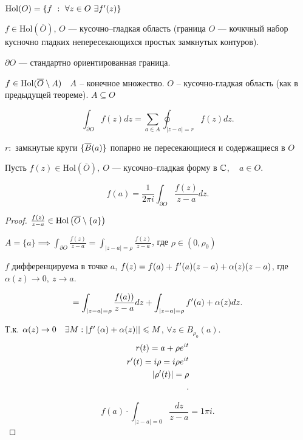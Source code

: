 $\mathrm{Hol} (O) = \{ f ~:~ \forall z \in O ~\exists f^{\prime} (z) \}$

\begin{theorem}[Коши]
    $f \in \mathrm{Hol} (\overline{O})$, $O$ --- кусочно--гладкая область (граница $O$  --- кочкчный набор кусночно  гладких непересекающихся простых замкнутых контуров).

    $\partial O$ --- стандартно ориентированная граница.
\end{theorem}

\begin{theorem}

    $f\in \mathrm{Hol}(\overline{O} \setminus A)\quad A$ -- конечное множество. $O$ -- кусочно-гладкая область (как в предыдущей теореме). $A \subseteq O$

    \[
    \int_{\partial O} f(z) dz = \sum_{a\in A} \oint_{|z-a| = r} f(z)dz
    .\]

    $r:$ замкнутые круги $\{\overline{B}(a)\}$ попарно не пересекающиеся и содержащиеся в $O$
\end{theorem}


\begin{statement}    
Пусть $f (z) \in \mathrm{Hol} (\overline{O}),~ O$ --- кусочно--гладкая форму в $\mathbb{C}$, ~ $a \in O$.

\[
f(a) = \frac{1}{2\pi i} \int_{\partial O} \frac{f(z)}{z-a}dz
.\]
\end{statement}
\begin{proof}
    $\frac{f(z)}{z-a}\in \mathrm{Hol}\left( \overline{O} \setminus \{a\} \right) $

    $A = \{a\} \implies \int_{\partial O} \frac{f(z)}{z-a} = \int_{|z-a| = \rho} \frac{f(z)}{z-a}$, где $\rho\in \left( 0, \rho_0 \right) $

    $f$  дифференцируема в точке $a$, $f(z) = f (a) + f^{\prime}(a) (z - a) + \alpha (z) (z - a)$, где $\alpha (z) \to 0, ~ z \to a$.

    \[ = \int_{|z - a | = \rho } \dfrac{f(a))}{z - a} dz + \int_{|z - a | = \rho} f^{\prime} (a) + \alpha (z) dz. \] %

    Т.к. $\alpha(z) \to 0\quad \exists M : \left| f^{\prime}\left( \alpha\right) + \alpha (z)|  \right| \leqslant M$, $\forall z \in B_{\rho_0}(a)$.
    \begin{align*}
        r(t) = a + \rho e^{it}\\
        r^{\prime}(t) = i\rho = i\rho e^{it}\\
        \left| \rho^{\prime}(t) \right|  = \rho\\
    .\end{align*}

\[
f(a) \cdot  \int_{|z-a| = 0}\frac{dz}{z-a} = 1\pi i
.\]
\end{proof}

